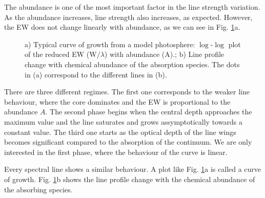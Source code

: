 \documentclass[dvips,12pt,a4paper]{report}
\begin{document}
{The abundance is one of the most important factor in the line strength variation. As the abundance increases, line strength also increases, as expected. However, the EW does not change linearly with abundance, as we can see in Fig. \ref{cog}a. 
\begin{figure}[h]
\centering
{}
\caption[EW and Profile dependence of abundance] {a) Typical curve of growth from a model photosphere: $\log$-$\log$ plot of the reduced EW (W$/\lambda$) with abundance (A).; b) Line profile change with chemical abundance of the absorption species. The dots in (a) correspond to the different lines in (b).}
\label{cog}
\end{figure}

There are three different regimes. The first one corresponds to the weaker line behaviour, where the core dominates and the EW is proportional to the abundance $A$. The second phase begins when the central depth approaches the maximum value and the line saturates and grows assymptotically towards a constant value. The third one starts as the optical depth of the line wings becomes significant compared to the absorption of the continuum. We are only interested in the first phase, where the behaviour of the curve is linear.

Every spectral line shows a similar behaviour. A plot like Fig. \ref{cog}a is called a curve of growth. Fig. \ref{cog}b shows the line profile change with the chemical abundance of the absorbing species. 

}
\end{document}
